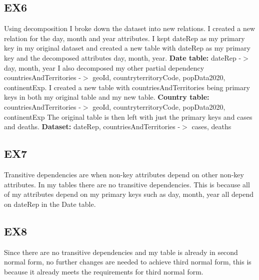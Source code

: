 \documentclass[]{article}
\begin{document}
\subsection{EX6}
Using decomposition I broke down the dataset into new relations.
\newline
\newline
I created a new relation for the day, month and year attributes. I kept dateRep as my primary key
in my original dataset and created a new table with dateRep as my primary key and the decomposed attributes day, month,
year.
\newline
\newline
\textbf{Date table:} dateRep -$>$  day, month, year
\newline
\newline
I also decomposed my other partial dependency countriesAndTerritories -$>$ geoId, countryterritoryCode,
popData2020, continentExp. I created a new table with countriesAndTerritories being primary keys in both
my original table and my new table.
\newline
\newline
\textbf{Country table:} countriesAndTerritories -$>$ geoId, countryterritoryCode,
popData2020, continentExp
\newline
\newline
The original table is then left with just the primary keys and cases and deaths.
\newline
\newline
\textbf{Dataset:} dateRep, countriesAndTerritories -$>$ cases, deaths

\subsection{EX7}

Transitive dependencies are when non-key attributes depend on other non-key attributes.
In my tables there are no transitive dependencies. This is because all of my attributes
depend on my primary keys such as day, month, year all depend on dateRep in the Date table.

\subsection{EX8}

Since there are no transitive dependencies and my table is already in second normal form,
no further changes are needed to achieve third normal form, this is because it already meets the
requirements for third normal form.
\end{document}
